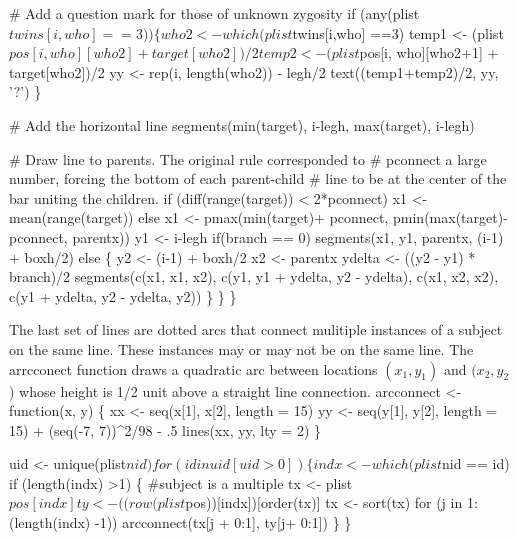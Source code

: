 \documentclass{article}
\begin{document}
\begin{enumerate}
        # Add a question mark for those of unknown zygosity
        if (any(plist$twins[i,who] ==3)) \{
          who2 <- which(plist$twins[i,who] ==3)
          temp1 <- (plist$pos[i, who][who2] + target[who2])/2
          temp2 <- (plist$pos[i, who][who2+1] + target[who2])/2
            yy <- rep(i, length(who2)) - legh/2
            text((temp1+temp2)/2, yy, '?')
            \}
        
        # Add the horizontal line 
        segments(min(target), i-legh, max(target), i-legh)

        # Draw line to parents.  The original rule corresponded to
        #  pconnect a large number, forcing the bottom of each parent-child
        #  line to be at the center of the bar uniting the children.
        if (diff(range(target)) < 2*pconnect) x1 <- mean(range(target))
        else x1 <- pmax(min(target)+ pconnect, pmin(max(target)-pconnect, 
                                                    parentx))
        y1 <- i-legh
        if(branch == 0)
            segments(x1, y1, parentx, (i-1) + boxh/2)
        else \{
            y2 <- (i-1) + boxh/2
            x2 <- parentx
            ydelta <- ((y2 - y1) * branch)/2
            segments(c(x1, x1, x2), c(y1, y1 + ydelta, y2 - ydelta), 
                     c(x1, x2, x2), c(y1 + ydelta, y2 - ydelta, y2))
            \}
        \}
    \}
\nwendcode{}\nwdocspar

The last set of lines are dotted arcs that connect mulitiple instances of
a subject on the same line.  These instances may or may not be on the
same line.
The arrcconect function draws a quadratic arc between locations $(x_1, y_1)$
and $(x_2, y_2$) whose height is 1/2 unit above a straight line connection.
\nwenddocs{}\plusendmoddef
arcconnect <- function(x, y) \{
    xx <- seq(x[1], x[2], length = 15)
    yy <- seq(y[1], y[2], length = 15) + (seq(-7, 7))^2/98 - .5
    lines(xx, yy, lty = 2)
    \}

uid <- unique(plist$nid)
for (id in uid[uid>0]) \{
    indx <- which(plist$nid == id)
    if (length(indx) >1) \{   #subject is a multiple
        tx <- plist$pos[indx]
        ty <- ((row(plist$pos))[indx])[order(tx)]
        tx <- sort(tx)
        for (j in 1:(length(indx) -1))
            arcconnect(tx[j + 0:1], ty[j+  0:1])
        \}
    \}
\nwendcode{}\nwdocspar


\end{enumerate}
\end{document}
